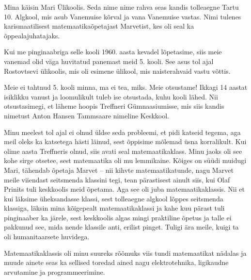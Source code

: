 

Mina käisin Mari Ülikoolis. Seda nime
nime rahva seas kandis tolleaegne Tartu 10. Algkool, mis asub Vanemuise 
kõrval ja vana Vanemuise vastas. Nimi tulenes karismaatilisest 
matemaatikaõpetajast Marvetist, kes oli seal ka õppealajuhatajaks.

Kui me pinginaabriga selle kooli 1960. aasta kevadel lõpetasime, siis 
meie vanemad olid väga huvitatud panemast meid 5. kooli. See asus tol ajal Rostovtsevi ülikoolis, mis oli esimene 
ülikool, mis naisterahvaid vastu võttis. 

Meie ei tahtnud 5. kooli minna, ma ei tea, miks. Meie otsustame! 
Ikkagi 14 aastat isiklikku vanust ja loomulikult tuleb ise otsustada, kuhu kooli 
lähed. Nii otsustasimegi, et läheme hoopis 
Treffneri Gümnaasiumisse, mis siis kandis 
nimetust Anton Hansen Tammsaare nimeline Keskkool. 

Minu meelest tol ajal ei 
olnud üldse seda probleemi, et pidi katseid tegema, aga 
meil oleks ka katsetega hästi läinud, sest õppisime mõlemad üsna 
korralikult. Kui olime aasta Treffneris olnud, siis avati seal 
matemaatikaklass. Minu jaoks oli see kohe sirge otsetee, sest
matemaatika oli mu lemmikaine. Kõiges on süüdi muidugi Mari, tähendab õpetaja 
Marvet – nii kihvte matemaatikatunde, 
nagu Marvet meile viiendast seitsmenda klassini tegi, tean pärastisest ainult siis, 
kui Olaf Prinits tuli keskkoolis meid õpetama. Aga 
see oli juba matemaatikaklassis. Nii et kui läksime üheksandasse klassi, sest 
tolleaegne algkool lõppes seitsmenda klassiga, läksin mina kõigepealt matemaatikaklassi ja kahe kuu pärast tuli pinginaaber ka järele, sest 
keskkoolis algas mingi praktiline õpetus ja talle ei pakkunud see, mida nende 
klassile anti, erilist pinget. Tuligi ära meile, 
kuigi ta oli humanitaarsete huvidega. 

Matemaatikaklassis oli minu suureks rõõmuks viis tundi matemaatikat nädalas 
ja muude ainete seas ka sellised toredad ained nagu elektrotehnika, ligikaudne 
arvutamine ja programmeerimine. 



